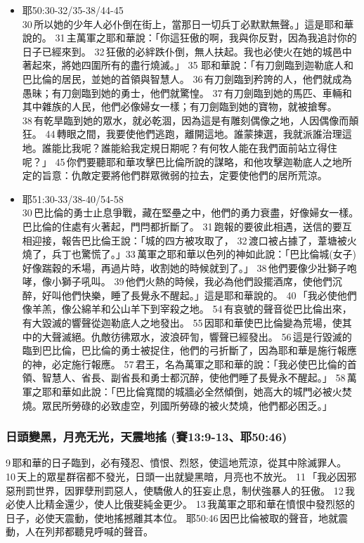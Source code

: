 \begin{itemize}
\item 耶50:30-32/35-38/44-45\\
30 所以她的少年人必仆倒在街上，當那日一切兵丁必默默無聲。」這是耶和華說的。 31 主萬軍之耶和華說：「你這狂傲的啊，我與你反對，因為我追討你的日子已經來到。 32 狂傲的必絆跌仆倒，無人扶起。我也必使火在她的城邑中著起來，將她四圍所有的盡行燒滅。」
35 耶和華說：「有刀劍臨到迦勒底人和巴比倫的居民，並她的首領與智慧人。 36 有刀劍臨到矜誇的人，他們就成為愚昧；有刀劍臨到她的勇士，他們就驚惶。 37 有刀劍臨到她的馬匹、車輛和其中雜族的人民，他們必像婦女一樣；有刀劍臨到她的寶物，就被搶奪。 38 有乾旱臨到她的眾水，就必乾涸，因為這是有雕刻偶像之地，人因偶像而顛狂。 
44 轉眼之間，我要使他們逃跑，離開這地。誰蒙揀選，我就派誰治理這地。誰能比我呢？誰能給我定規日期呢？有何牧人能在我們面前站立得住呢？」 45 你們要聽耶和華攻擊巴比倫所說的謀略，和他攻擊迦勒底人之地所定的旨意：仇敵定要將他們群眾微弱的拉去，定要使他們的居所荒涼。 
\item 耶51:30-33/38-40/54-58\\
30 巴比倫的勇士止息爭戰，藏在堅壘之中，他們的勇力衰盡，好像婦女一樣。巴比倫的住處有火著起，門閂都折斷了。 31 跑報的要彼此相遇，送信的要互相迎接，報告巴比倫王說：「城的四方被攻取了， 32 渡口被占據了，葦塘被火燒了，兵丁也驚慌了。」33 萬軍之耶和華以色列的神如此說：「巴比倫城(女子)好像踹穀的禾場，再過片時，收割她的時候就到了。」 
38 他們要像少壯獅子咆哮，像小獅子吼叫。 39 他們火熱的時候，我必為他們設擺酒席，使他們沉醉，好叫他們快樂，睡了長覺永不醒起。」這是耶和華說的。 40 「我必使他們像羊羔，像公綿羊和公山羊下到宰殺之地。
54 有哀號的聲音從巴比倫出來，有大毀滅的響聲從迦勒底人之地發出。 55 因耶和華使巴比倫變為荒場，使其中的大聲滅絕。仇敵彷彿眾水，波浪砰訇，響聲已經發出。 56 這是行毀滅的臨到巴比倫，巴比倫的勇士被捉住，他們的弓折斷了，因為耶和華是施行報應的神，必定施行報應。 57 君王，名為萬軍之耶和華的說：「我必使巴比倫的首領、智慧人、省長、副省長和勇士都沉醉，使他們睡了長覺永不醒起。」 58 萬軍之耶和華如此說：「巴比倫寬闊的城牆必全然傾倒，她高大的城門必被火焚燒。眾民所勞碌的必致虛空，列國所勞碌的被火焚燒，他們都必困乏。」
\end{itemize}

\subsubsection{日頭變黑，月亮无光，天震地搖 (賽13:9-13、耶50:46)}
9 耶和華的日子臨到，必有殘忍、憤恨、烈怒，使這地荒涼，從其中除滅罪人。 10 天上的眾星群宿都不發光，日頭一出就變黑暗，月亮也不放光。 11 「我必因邪惡刑罰世界，因罪孽刑罰惡人，使驕傲人的狂妄止息，制伏強暴人的狂傲。 12 我必使人比精金還少，使人比俄斐純金更少。 13 我萬軍之耶和華在憤恨中發烈怒的日子，必使天震動，使地搖撼離其本位。
耶50:46 因巴比倫被取的聲音，地就震動，人在列邦都聽見呼喊的聲音。

